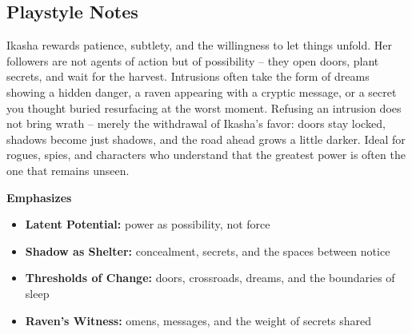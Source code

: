 \subsection*{Playstyle Notes}
Ikasha rewards patience, subtlety, and the willingness to let things unfold. Her followers are not agents of action but of possibility -- they open doors, plant secrets, and wait for the harvest. Intrusions often take the form of dreams showing a hidden danger, a raven appearing with a cryptic message, or a secret you thought buried resurfacing at the worst moment. Refusing an intrusion does not bring wrath -- merely the withdrawal of Ikasha's favor: doors stay locked, shadows become just shadows, and the road ahead grows a little darker. Ideal for rogues, spies, and characters who understand that the greatest power is often the one that remains unseen.

\noindent\textbf{Emphasizes}
\begin{itemize}
  \item \textbf{Latent Potential:} power as possibility, not force
  \item \textbf{Shadow as Shelter:} concealment, secrets, and the spaces between notice
  \item \textbf{Thresholds of Change:} doors, crossroads, dreams, and the boundaries of sleep
  \item \textbf{Raven's Witness:} omens, messages, and the weight of secrets shared
\end{itemize}

